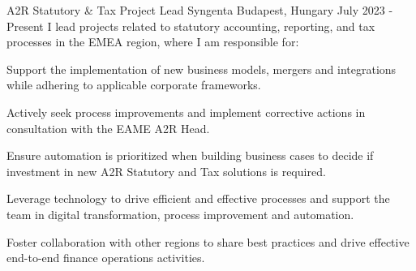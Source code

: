 


\begin{cventries}


  \cventry
    {A2R Statutory \& Tax Project Lead} %
    {Syngenta} %
    {Budapest, Hungary} %
    {July 2023 - Present} %
    {I lead projects related to statutory accounting, reporting, and tax processes in the EMEA region, where I am responsible for:} %
    {
      \begin{cvitems} %
        \item {Support the implementation of new business models, mergers and integrations while adhering to applicable corporate frameworks.}
        \item {Actively seek process improvements and implement corrective actions in consultation with the EAME A2R Head.}
        \item {Ensure automation is prioritized when building business cases to decide if investment in new A2R Statutory and Tax solutions is required.}
        \item {Leverage technology to drive efficient and effective processes and support the team in digital transformation, process improvement and automation.}
        \item {Foster collaboration with other regions to share best practices and drive effective end-to-end finance operations activities.}
      \end{cvitems}
    }



\end{cventries}
